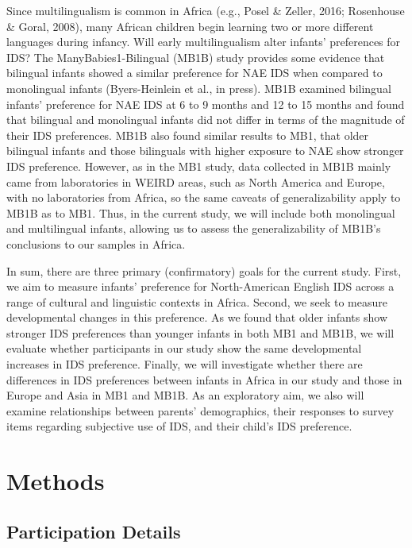 \documentclass[
  ,man,floatsintext]{apa6}
\begin{document}
Since multilingualism is common in Africa (e.g., Posel \& Zeller, 2016; Rosenhouse \& Goral, 2008), many African children begin learning two or more different languages during infancy. Will early multilingualism alter infants' preferences for IDS? The ManyBabies1-Bilingual (MB1B) study provides some evidence that bilingual infants showed a similar preference for NAE IDS when compared to monolingual infants (Byers-Heinlein et al., in press). MB1B examined bilingual infants' preference for NAE IDS at 6 to 9 months and 12 to 15 months and found that bilingual and monolingual infants did not differ in terms of the magnitude of their IDS preferences. MB1B also found similar results to MB1, that older bilingual infants and those bilinguals with higher exposure to NAE show stronger IDS preference. However, as in the MB1 study, data collected in MB1B mainly came from laboratories in WEIRD areas, such as North America and Europe, with no laboratories from Africa, so the same caveats of generalizability apply to MB1B as to MB1. Thus, in the current study, we will include both monolingual and multilingual infants, allowing us to assess the generalizability of MB1B's conclusions to our samples in Africa.

In sum, there are three primary (confirmatory) goals for the current study. First, we aim to measure infants' preference for North-American English IDS across a range of cultural and linguistic contexts in Africa. Second, we seek to measure developmental changes in this preference. As we found that older infants show stronger IDS preferences than younger infants in both MB1 and MB1B, we will evaluate whether participants in our study show the same developmental increases in IDS preference. Finally, we will investigate whether there are differences in IDS preferences between infants in Africa in our study and those in Europe and Asia in MB1 and MB1B. As an exploratory aim, we also will examine relationships between parents' demographics, their responses to survey items regarding subjective use of IDS, and their child's IDS preference.

\hypertarget{methods}{%
\section{Methods}\label{methods}}

\hypertarget{participation-details}{%
\subsection{Participation Details}\label{participation-details}}
\end{document}
